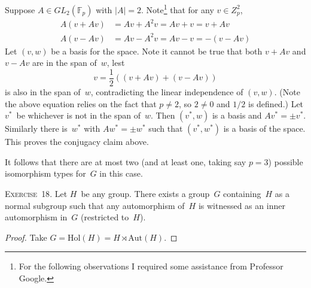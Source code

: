 \documentclass[letterpaper]{article}
\newcommand{\exercise}[1]{\goodbreak\noindent\textsc{Exercise~{#1}.}}
\newcommand{\F}{\mathbb{F}}
\newcommand{\aut}{\mathrm{Aut}}
\newcommand{\hol}{\mathrm{Hol}}
\newcommand{\ord}[1]{|{#1}|}
\begin{document}
Suppose $A\in GL_2(\F_p)$ with $\ord{A}=2$. Note\footnote{For the following observations I required some assistance from Professor Google.} that for any $v\in Z_p^2$,
\begin{align*}
A(v+Av)&=Av+A^2v=Av+v=v+Av\\
A(v-Av)&=Av-A^2v=Av-v=-(v-Av)
\end{align*}
Let $(v,w)$ be a basis for the space. Note it cannot be true that both $v+Av$ and $v-Av$ are in the span of~$w$, lest
$$v=\frac{1}{2}((v+Av)+(v-Av))$$
is also in the span of~$w$, contradicting the linear independence of $(v,w)$. (Note the above equation relies on the fact that $p\ne2$, so $2\ne0$ and $1/2$ is defined.) Let $v^*$~be whichever is not in the span of~$w$. Then $(v^*,w)$ is a basis and $Av^*=\pm v^*$. Similarly there is~$w^*$ with $Aw^*=\pm w^*$ such that $(v^*,w^*)$ is a basis of the space. This proves the conjugacy claim above.

It follows that there are at most two (and at least one, taking say $p=3$) possible isomorphism types for~$G$ in this case.

\bigskip
\exercise{18}
Let $H$~be any group. There exists a group~$G$ containing~$H$ as a normal subgroup such that any automorphism of~$H$ is witnessed as an inner automorphism in~$G$ (restricted to~$H$).
\begin{proof}
Take $G=\hol(H)=H\rtimes\aut(H)$.
\end{proof}
\end{document}
